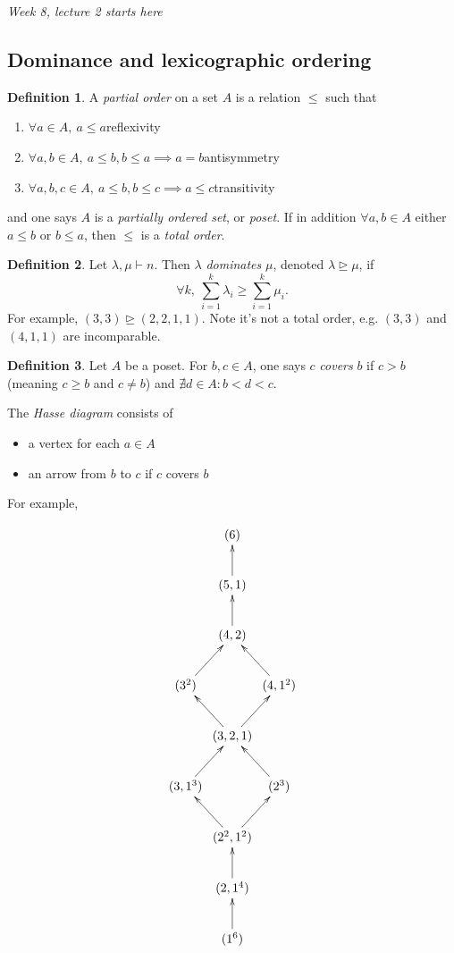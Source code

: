 \documentclass[a4paper]{article}
\theoremstyle{definition}
\newtheorem{defn}{Definition}[subsection]
\begin{document}
\begin{flushright}
\textit{Week 8, lecture 2 starts here}
\end{flushright}

\subsection{Dominance and lexicographic ordering}
\begin{defn}
A \textit{partial order} on a set $A$ is a relation $\leq$ such that
\begin{enumerate}
\item $\forall a\in A,\ a\leq a$\hfill reflexivity
\item $\forall a,b\in A,\ a\leq b,b\leq a\implies a=b$\hfill antisymmetry
\item $\forall a,b,c\in A,\ a\leq b,b\leq c\implies a\leq c$\hfill transitivity
\end{enumerate}
and one says $A$ is a \textit{partially ordered set}, or \textit{poset}. If in addition $\forall a,b\in A$ either $a\leq b$ or $b\leq a$, then $\leq$ is a \textit{total order}.
\end{defn}

\begin{defn}
Let $\lambda,\mu\vdash n$. Then $\lambda$ \textit{dominates} $\mu$, denoted $\lambda\unrhd \mu$, if
\[
\forall k,\ \sum_{i=1}^k \lambda_i\geq \sum_{i=1}^k \mu_i.
\]
For example, $(3,3)\unrhd (2,2,1,1)$. Note it's not a total order, e.g. $(3,3)$ and $(4,1,1)$ are incomparable.
\end{defn}

\begin{defn}
Let $A$ be a poset. For $b,c\in A$, one says $c$ \textit{covers} $b$ if $c>b$ (meaning $c\geq b$ and $c\neq b$) and $\nexists d\in A:b<d<c$.

The \textit{Hasse diagram} consists of
\begin{itemize}
\item a vertex for each $a\in A$
\item an arrow from $b$ to $c$ if $c$ covers $b$
\end{itemize}
For example,

\[
\xymatrix@C=0.2em{
  &(6)\\
  &(5,1)\ar[u]\\
  &(4,2)\ar[u]\\
  (3^2)\ar[ur] & & (4,1^2)\ar[ul]\\
  &(3,2,1)\ar[ur]\ar[ul]\\
  (3,1^3)\ar[ur] & & (2^3)\ar[ul]\\
  &(2^2,1^2)\ar[ul]\ar[ur]\\
  &(2,1^4)\ar[u]\\
  &(1^6)\ar[u]
}
\]
\end{defn}
\end{document}
